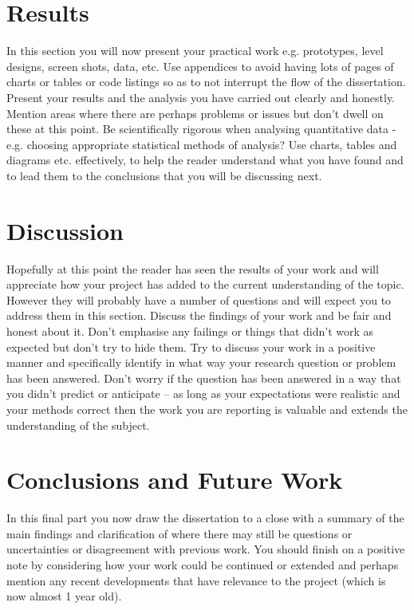 \documentclass[a4paper, 12pt]{article}
\begin{document}
\pagebreak


\section{Results} %
In this section you will now present your practical work e.g. prototypes, level designs, screen shots, data, etc. Use appendices to avoid having lots of pages of charts or tables or code listings so as to not interrupt the flow of the dissertation. Present your results and the analysis you have carried out clearly and honestly. Mention areas where there are perhaps problems or issues but don’t dwell on these at this point. Be scientifically rigorous when analysing quantitative data - e.g. choosing appropriate statistical methods of analysis? Use charts, tables and diagrams etc. effectively, to help the reader understand what you have found and to lead them to the conclusions that you will be discussing next.

\pagebreak


\section{Discussion} %
Hopefully at this point the reader has seen the results of your work and will appreciate how your project has added to the current understanding of the topic. However they will probably have a number of questions and will expect you to address them in this section. Discuss the findings of your work and be fair and honest about it. Don’t emphasise any failings or things that didn’t work as expected but don’t try to hide them. Try to discuss your work in a positive manner and specifically identify in what way your research question or problem has been answered. Don’t worry if the question has been answered in a way that you didn’t predict or anticipate – as long as your expectations were realistic and your methods correct then the work you are reporting is valuable and extends the understanding of the subject.

\pagebreak


\section{Conclusions and Future Work} %
In this final part you now draw the dissertation to a close with a summary of the main findings and clarification of where there may still be questions or uncertainties or disagreement with previous work. You should finish on a positive note by considering how your work could be continued or extended and perhaps mention any recent developments that have relevance to the project (which is now almost 1 year old).
\end{document}
